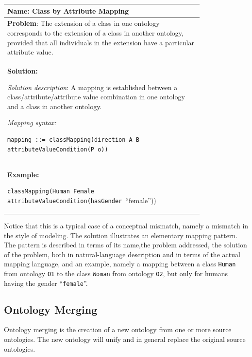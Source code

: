 \documentclass{fast_latex}
\begin{document}
\begin{center}
\label{tab:MappingPattern}
\tablehead{}
\begin{supertabular}{|m{0.8\linewidth}|}
\hline
\textbf{Name}: Class by Attribute Mapping \\\hline
\textbf{Problem}: The extension of a class in one ontology
corresponds to the extension of a class in another ontology, provided
that all individuals in the extension have a particular attribute
value. \\\hline
\textbf{Solution:} 

\textit{Solution description}: A mapping is established
between a class/attribute/attribute value combination in one ontology
and a class in another ontology. 

\textit{Mapping syntax:} 

\texttt{mapping ::= classMapping(direction A
B attributeValueCondition(P o))} \\\hline
\textbf{Example:} 

\texttt{classMapping(Human Female
attributeValueCondition(hasGender
}{\textquotedblleft}female{\textquotedblright})) \\\hline
\end{supertabular}
\end{center}

Notice that this is a typical case of a
conceptual mismatch, namely a mismatch in the style of modeling. The
solution illustrates an elementary mapping pattern. The pattern is
described in terms of its name,the problem addressed, the solution of
the problem, both in natural-language description and in terms of the
actual mapping language, and an example, namely a mapping between a
class \texttt{Human} from ontology
\texttt{O1} to the class \texttt{Woman} from
ontology \texttt{O2}, but only for humans having the
gender
{\textquotedblleft}\texttt{female}{\textquotedblright}.

\subsection{Ontology Merging}
\label{subsec:mediationapproaches_ontologymerging}
Ontology merging is the creation of a new ontology from one or more
source ontologies. The new ontology will unify and in general replace
the original source ontologies. 
\end{document}
